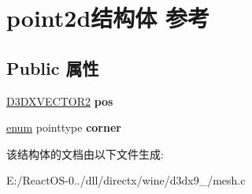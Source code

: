 \hypertarget{structpoint2d}{}\section{point2d结构体 参考}
\label{structpoint2d}
\subsection*{Public 属性}
\begin{DoxyCompactItemize}
\item 
\mbox{\label{structpoint2d_a4c6404afe63ad32feffafa4774e4e618}} 
\hyperlink{struct_d3_d_x_v_e_c_t_o_r2}{D3\+D\+X\+V\+E\+C\+T\+O\+R2} {\bfseries pos}
\item 
\mbox{\label{structpoint2d_addce0239d3fa71b9b7921cfd275d06c9}} 
\hyperlink{interfaceenum}{enum} pointtype {\bfseries corner}
\end{DoxyCompactItemize}


该结构体的文档由以下文件生成\+:\begin{DoxyCompactItemize}
\item 
E\+:/\+React\+O\+S-\/0../dll/directx/wine/d3dx9\+\_/mesh.\+c\end{DoxyCompactItemize}
